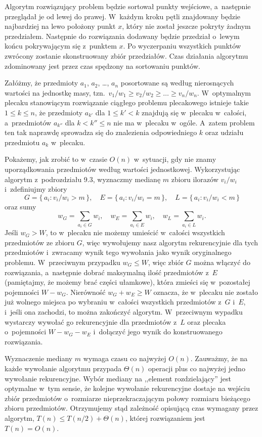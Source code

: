 Algorytm rozwiązujący problem będzie sortował punkty wejściowe, a~następnie przeglądał je od lewej do prawej.
W~każdym kroku pętli znajdowany będzie najbardziej na lewo położony punkt $x$, który nie został jeszcze pokryty żadnym przedziałem.
Następnie do rozwiązania dodawany będzie przedział o~lewym końcu pokrywającym się z~punktem $x$.
Po wyczerpaniu wszystkich punktów zwrócony zostanie skonstruowany zbiór przedziałów.
Czas działania algorytmu zdominowany jest przez czas spędzony na sortowaniu punktów.

\exercise %
Załóżmy, że przedmioty $a_1$, $a_2$, \dots, $a_n$ posortowane są według nierosnących wartości na jednostkę masy, tzn.\ $v_1/w_1\ge v_2/w_2\ge\dots\ge v_n/w_n$.
W~optymalnym plecaku stanowiącym rozwiązanie ciągłego problemu plecakowego istnieje takie $1\le k\le n$, że przedmioty $a_{k'}$ dla $1\le k'<k$ znajdują się w~plecaku w~całości, a~przedmiotów $a_{k''}$ dla $k<k''\le n$ nie ma w~plecaku w~ogóle.
A~zatem problem ten tak naprawdę sprowadza się do znalezienia odpowiedniego $k$ oraz udziału przedmiotu $a_k$ w~plecaku.

Pokażemy, jak zrobić to w~czasie $O(n)$ w~sytuacji, gdy nie znamy uporządkowania przedmiotów według wartości jednostkowej.
Wykorzystując algorytm  z~podrozdziału 9.3, wyznaczmy medianę $m$ zbioru ilorazów $v_i/w_i$ i~zdefiniujmy zbiory
\[
	G = \{\,a_i:v_i/w_i>m\,\}, \quad E = \{\,a_i:v_i/w_i=m\,\}, \quad L = \{\,a_i:v_i/w_i<m\,\}
\]
oraz sumy
\[
	w_G = \sum_{a_i\in G}w_i, \quad w_E = \sum_{a_i\in E}w_i, \quad w_L = \sum_{a_i\in L}w_i.
\]
Jeśli $w_G>W$, to w~plecaku nie możemy umieścić w~całości wszystkich przedmiotów ze zbioru $G$, więc wywołujemy nasz algorytm rekurencyjnie dla tych przedmiotów i~zwracamy wynik tego wywołania jako wynik oryginalnego problemu.
W~przeciwnym przypadku $w_G\le W$, więc zbiór $G$ można włączyć do rozwiązania, a~następnie dobrać maksymalną ilość przedmiotów z~$E$ (pamiętajmy, że możemy brać części ułamkowe), która zmieści się w~pozostałej pojemności $W-w_G$.
Nierówność $w_G+w_E\ge W$ oznacza, że w~plecaku nie zostało już wolnego miejsca po wybraniu w~całości wszystkich przedmiotów z~$G$ i~$E$, i~jeśli ona zachodzi, to można zakończyć algorytm.
W~przeciwnym wypadku wystarczy wywołać go rekurencyjnie dla przedmiotów z~$L$ oraz plecaka o~pojemności $W-w_G-w_E$ i~dołączyć jego wynik do konstruowanego rozwiązania.

Wyznaczenie mediany $m$ wymaga czasu co najwyżej $O(n)$.
Zauważmy, że na każde wywołanie algorytmu przypada $\Theta(n)$ operacji plus co najwyżej jedno wywołanie rekurencyjne.
Wybór mediany na ,,element rozdzielający'' jest optymalne w~tym sensie, że kolejne wywołanie rekurencyjne dostaje na wejściu zbiór przedmiotów o~rozmiarze nieprzekraczającym połowy rozmiaru bieżącego zbioru przedmiotów.
Otrzymujemy stąd zależność opisującą czas wymagany przez algorytm, $T(n)\le T(n/2)+\Theta(n)$, której rozwiązaniem jest $T(n)=O(n)$.

